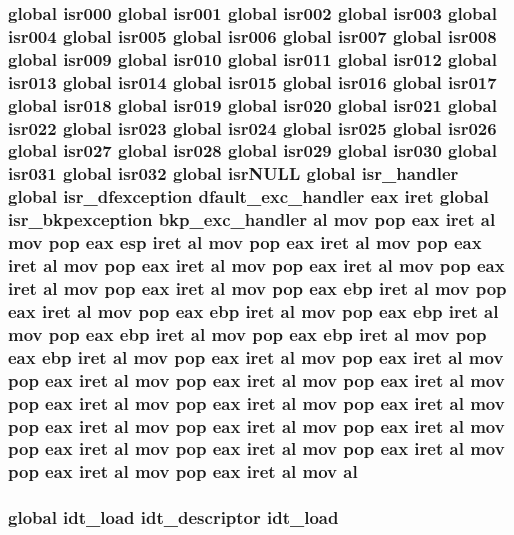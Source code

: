 \subsubsection[{\texorpdfstring{al}{al}}]{\setlength{\rightskip}{0pt plus 5cm}global {\bf isr000} global {\bf isr001} global {\bf isr002} global {\bf isr003} global {\bf isr004} global {\bf isr005} global {\bf isr006} global {\bf isr007} global {\bf isr008} global {\bf isr009} global {\bf isr010} global {\bf isr011} global {\bf isr012} global {\bf isr013} global {\bf isr014} global {\bf isr015} global {\bf isr016} global {\bf isr017} global {\bf isr018} global {\bf isr019} global {\bf isr020} global {\bf isr021} global {\bf isr022} global {\bf isr023} global {\bf isr024} global {\bf isr025} global {\bf isr026} global {\bf isr027} global {\bf isr028} global {\bf isr029} global {\bf isr030} global {\bf isr031} global isr032 global isr\+N\+U\+LL global isr\+\_\+handler global {\bf isr\+\_\+dfexception} {\bf dfault\+\_\+exc\+\_\+handler} eax iret global {\bf isr\+\_\+bkpexception} {\bf bkp\+\_\+exc\+\_\+handler} al {\bf mov} pop eax iret al {\bf mov} pop eax esp iret al {\bf mov} pop eax iret al {\bf mov} pop eax iret al {\bf mov} pop eax iret al {\bf mov} pop eax iret al {\bf mov} pop eax iret al {\bf mov} pop eax iret al {\bf mov} pop eax ebp iret al {\bf mov} pop eax iret al {\bf mov} pop eax ebp iret al {\bf mov} pop eax ebp iret al {\bf mov} pop eax ebp iret al {\bf mov} pop eax ebp iret al {\bf mov} pop eax ebp iret al {\bf mov} pop eax iret al {\bf mov} pop eax iret al {\bf mov} pop eax iret al {\bf mov} pop eax iret al {\bf mov} pop eax iret al {\bf mov} pop eax iret al {\bf mov} pop eax iret al {\bf mov} pop eax iret al {\bf mov} pop eax iret al {\bf mov} pop eax iret al {\bf mov} pop eax iret al {\bf mov} pop eax iret al {\bf mov} pop eax iret al {\bf mov} pop eax iret al {\bf mov} pop eax iret al {\bf mov} pop eax iret al {\bf mov} al}\hypertarget{idt_8as_a55801884e6527c2d735351b4d6b66caf}{}\label{idt_8as_a55801884e6527c2d735351b4d6b66caf}
\subsubsection[{\texorpdfstring{idt\+\_\+load}{idt_load}}]{\setlength{\rightskip}{0pt plus 5cm}global idt\+\_\+load {\bf idt\+\_\+descriptor} idt\+\_\+load}\hypertarget{idt_8as_a792b9114aca62725df021c6c6c4eb027}{}\label{idt_8as_a792b9114aca62725df021c6c6c4eb027}
